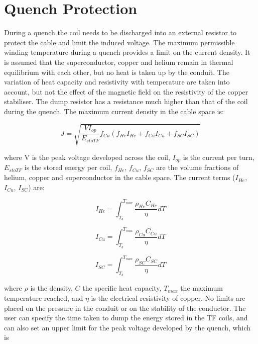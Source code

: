 \documentclass[hidelinks]{article}
\numberwithin{equation}{section}
\begin{document}
    \section{Quench Protection}

    During a quench the coil needs to be discharged into an external resistor to protect 
    the cable and limit the induced voltage.  The maximum permissible winding temperature 
    during a quench provides a limit on the current density.  It is assumed that the 
    superconductor, copper and helium remain in thermal equilibrium with each other, but 
    no heat is taken up by the conduit.  The variation of heat capacity and resistivity 
    with temperature are taken into account, but not the effect of the magnetic field on 
    the resistivity of the copper stabiliser.  The dump resistor has a resistance much 
    higher than that of the coil during the quench.  The maximum current density in the 
    cable space is:

    \begin{equation}\label{eq: max-curr-den}
        J = \sqrt{\frac{VI_{op}}{E_{stoTF}}f_{Cu}(f_{He}I_{He} + f_{Cu}I_{Cu} + f_{SC}I_{SC})}
    \end{equation}

    \noi where V is the peak voltage developed across the coil, $I_{op}$ is the 
    current per turn, $E_{stoTF}$ is the stored energy per coil, $f_{He}$, $f_{Cu}$, 
    $f_{SC}$ are the volume fractions of helium, copper and superconductor in the cable 
    space. The current terms ($I_{He}$, $I_{Cu}$, $I_{SC}$) are:

    \begin{equation}\label{eq: helium-curr-term}
        I_{He} = \int^{T_{max}}_{T_b}\frac{\rho_{He}C_{He}}{\eta} dT
    \end{equation}

    \begin{equation}\label{eq: copper-curr-term}
        I_{Cu} = \int^{T_{max}}_{T_b} \frac{\rho_{Cu}C_{Cu}}{\eta} dT
    \end{equation}

    \begin{equation}\label{eq: sc-curr-term}
        I_{SC} = \int^{T_{max}}_{T_b} \frac{\rho_{SC}C_{SC}}{\eta} dT
    \end{equation}

    \noi where $\rho$ is the density, $C$ the specific heat capacity, $T_{max}$ the 
    maximum temperature reached, and $\eta$ is the electrical resistivity of copper. No 
    limits are placed on the pressure in the conduit or on the stability of the conductor. 
    The user can specify the time taken to dump the energy stored in the TF coils, and can 
    also set an upper limit for the peak voltage developed by the quench, which is
\end{document}
